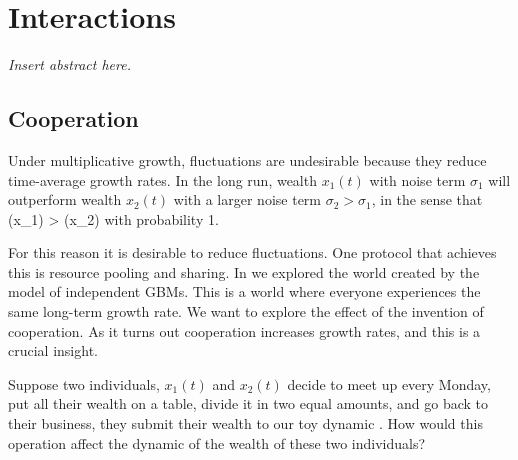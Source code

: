 %

\newpage


\section{Interactions}
{\it
Insert abstract here.
}
\newpage

\subsection{Cooperation}
Under multiplicative growth, fluctuations are undesirable because they reduce 
time-average growth rates. In the long run, wealth $x_1(t)$ with noise term 
$\sigma_1$ will outperform wealth $x_2(t)$ with a larger 
noise term $\sigma_2>\sigma_1$, in the sense that 
\be
\gt(x_1) > \gt(x_2)
\ee
with probability 1.

For this reason it is desirable to reduce fluctuations. One protocol that achieves this is 
resource pooling and sharing. In  we explored the world created 
by the model of independent GBMs. This is a world where everyone experiences the 
same long-term growth rate. We want to explore the effect of the invention of 
cooperation. As it turns out cooperation increases growth rates, and this is a 
crucial insight. 

Suppose two individuals, $x_1(t)$ and $x_2(t)$ decide to meet up every Monday, put all 
their wealth on a table, divide it in two equal amounts, and go back to their business, \ie
they submit their wealth to our toy dynamic . How 
would this operation affect the dynamic of the wealth of these two individuals?

